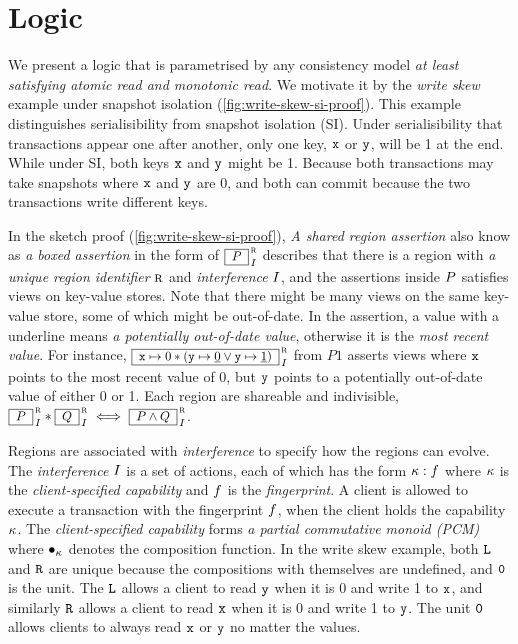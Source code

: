 \section{Logic}

We present a logic that is parametrised by any consistency model \emph{at least satisfying atomic  read and monotonic read}.
We motivate it by the \emph{write skew} example under snapshot isolation (\cref{fig:write-skew-si-proof}).
This example distinguishes serialisibility from snapshot isolation (SI).
Under serialisibility that transactions appear one after another, only one key, \( \texttt{x} \) or \( \texttt{y} \), will be 1 at the end.
While under SI, both keys \( \texttt{x} \) and \( \texttt{y} \) might be 1.
Because both transactions may take snapshots where \( \texttt{x} \) and \( \texttt{y} \) are 0, and both can commit because the two transactions write different keys.

In the sketch proof (\cref{fig:write-skew-si-proof}), \emph{A shared region assertion} also know as \emph{a boxed assertion} in the form of \( \boxass{\gpre}{\lrid}{\intass}\) describes that there is a region with \emph{a unique region identifier} \( \lrid \) and \emph{interference} \( I \), and the assertions inside \( P \) satisfies views on key-value stores.
Note that there might be many views on the same key-value store, some of which might be out-of-date.
In the assertion, a value with a underline means \emph{a potentially out-of-date value}, otherwise it is the \emph{most recent value}.
For instance, \( \boxass{\vx \pt 0 \sep ( \vy \pt \underline{0} \lor \vy \pt \underline{1} ) }{\lrid}{\intass}\) from \( P1 \) asserts views where \( \texttt{x} \) points to the most recent value of 0, but \( \texttt{y} \) points to a potentially out-of-date value of either 0 or 1.
Each region are shareable and indivisible, \ie \( \boxass{\gpre}{\lrid}{\intass} \sep \boxass{\gpost}{\lrid}{\intass} \iff \boxass{\gpre \land \gpost}{\lrid}{\intass}\).

Regions are associated with \emph{interference} to specify how the regions can evolve.
The \emph{interference} \( I \) is a set of actions, each of which has the form \( \kappa : f \) where \( \kappa \) is the \emph{client-specified capability} and \( f \) is the \emph{fingerprint}.
A client is allowed to execute a transaction with the fingerprint \( f \), when the client holds the capability \( \kappa \).
The \emph{client-specified capability} forms \emph{a partial commutative monoid (PCM)} where \( \bullet_{\kappa} \) denotes the composition function.
In the write skew example, both \( \texttt{L} \) and \( \texttt{R} \) are unique because the compositions with themselves are undefined, and \( \texttt{0} \) is the unit.
The \( \texttt{L}\) allows a client to read \( \texttt{y} \) when it is 0 and write 1 to \( \texttt{x} \), and similarly \( \texttt{R} \) allows a client to read \( \texttt{x} \) when it is 0 and write 1 to \( \texttt{y} \).
The unit \( \texttt{0} \) allows clients to always read \( \texttt{x} \) or \( \texttt{y} \) no matter the values.

